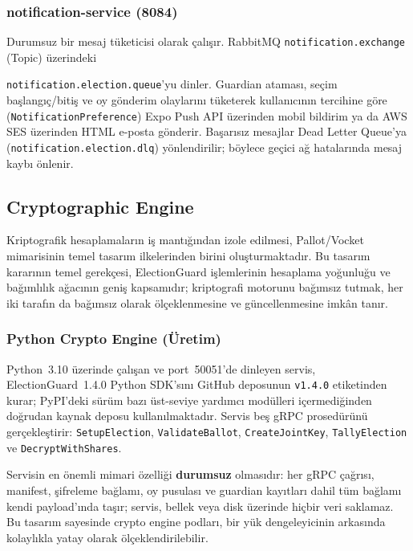 \documentclass[a4paper,fleqn]{cas-sc}
\begin{document}
\subsubsection{notification-service (8084)}

Durumsuz bir mesaj tüketicisi olarak çalışır.
RabbitMQ \texttt{notification.exchange} (Topic) üzerindeki

\texttt{notification.election.queue}'yu dinler.
Guardian ataması, seçim başlangıç/bitiş ve oy gönderim olaylarını
tüketerek kullanıcının tercihine göre (\texttt{NotificationPreference})
Expo Push API üzerinden mobil bildirim ya da AWS SES üzerinden
HTML e-posta gönderir.
Başarısız mesajlar Dead Letter Queue'ya (\texttt{notification.election.dlq})
yönlendirilir; böylece geçici ağ hatalarında mesaj kaybı önlenir.

\subsection{Cryptographic Engine}
\label{subsec:cryptoengine}

Kriptografik hesaplamaların iş mantığından izole edilmesi, Pallot/Vocket
mimarisinin temel tasarım ilkelerinden birini oluşturmaktadır.
Bu tasarım kararının temel gerekçesi, ElectionGuard işlemlerinin
hesaplama yoğunluğu ve bağımlılık ağacının geniş kapsamıdır;
kriptografi motorunu bağımsız tutmak, her iki tarafın da bağımsız olarak
ölçeklenmesine ve güncellenmesine imkân tanır.

\subsubsection{Python Crypto Engine (Üretim)}

Python~3.10 üzerinde çalışan ve port~50051'de dinleyen servis,
ElectionGuard~1.4.0 Python SDK'sını
GitHub deposunun \texttt{v1.4.0} etiketinden kurar; PyPI'deki sürüm
bazı üst-seviye yardımcı modülleri içermediğinden doğrudan kaynak
deposu kullanılmaktadır.
Servis beş gRPC prosedürünü gerçekleştirir:
\texttt{SetupElection}, \texttt{ValidateBallot}, \texttt{CreateJointKey},
\texttt{TallyElection} ve \texttt{DecryptWithShares}.

Servisin en önemli mimari özelliği \textbf{durumsuz} olmasıdır: her gRPC
çağrısı, manifest, şifreleme bağlamı, oy pusulası ve guardian kayıtları
dahil tüm bağlamı kendi payload'ında taşır; servis, bellek veya disk
üzerinde hiçbir veri saklamaz.
Bu tasarım sayesinde crypto engine podları, bir yük dengeleyicinin
arkasında kolaylıkla yatay olarak ölçeklendirilebilir.
\end{document}
